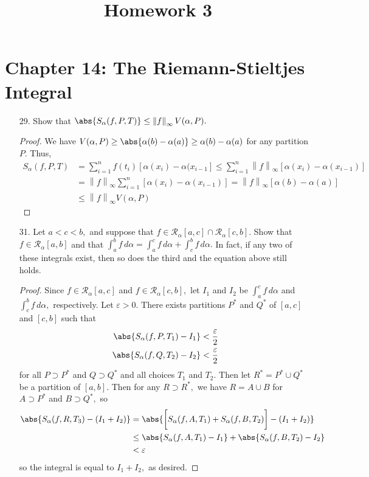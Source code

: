 \documentclass{article}
\begin{document}
\title{Homework 3}
\maketitle
\thispagestyle{fancy}

\section*{Chapter 14: The Riemann-Stieltjes Integral}

\begin{itemize}
	\item[29.] Show that $\abs{S_\alpha(f, P, T)}\le \left\lVert f \right\rVert_\infty V(\alpha, P).$
		\begin{proof}
			We have $V(\alpha, P)\ge \abs{\alpha(b)-\alpha(a)}\ge \alpha(b)-\alpha(a)$ for any partition $P.$ Thus,
			\begin{align*}
				S_\alpha(f, P, T) &= \sum_{i=1}^{n} f(t_i)\left[ \alpha(x_i)-\alpha(x_{i-1} \right] \le \sum_{i=1}^{n} \left\lVert f \right\rVert_\infty \left[ \alpha(x_i)-\alpha(x_{i-1})\right] \\
				&= \left\lVert f \right\rVert_\infty \sum_{i=1}^{n} \left[ \alpha(x_i)-\alpha(x_{i-1}) \right] = \left\lVert f \right\rVert_\infty \left[ \alpha(b)-\alpha(a) \right] \\
				&\le \left\lVert f \right\rVert_\infty V(\alpha, P)
			\end{align*}
		\end{proof}

	\item[31.] Let $a<c<b,$ and suppose that $f\in\mathcal R_\alpha[a, c]\cap \mathcal R_\alpha[c, b].$ Show that $f\in\mathcal R_\alpha[a, b]$ and that $\int_a^bf\, d\alpha=\int_a^c f\, d\alpha + \int_c^b f\, d\alpha.$ In fact, if any two of these integrals exist, then so does the third and the equation above still holds.
		\begin{proof}
			Since $f\in \mathcal R_\alpha[a, c]$ and $f\in\mathcal R_\alpha[c, b],$ let $I_1$ and $I_2$ be $\int_a^c f\, d\alpha$ and $\int_c^b f\, d\alpha,$ respectively. Let $\varepsilon>0.$ There exists partitions $P^*$ and $Q^*$ of $[a, c]$ and $[c, b]$ such that
			\begin{align*}
				\abs{S_\alpha(f, P, T_1)-I_1} &< \frac{\varepsilon}{2} \\
				\abs{S_\alpha(f, Q, T_2) - I_2} &< \frac{\varepsilon}{2}
			\end{align*}
			for all $P\supset P^*$ and $Q\supset Q^*$ and all choices $T_1$ and $T_2.$ Then let $R^*=P^*\cup Q^*$ be a partition of $[a, b].$ Then for any $R\supset R^*,$ we have $R=A\cup B$ for $A\supset P^*$ and $B\supset Q^*,$ so
			\begin{align*}
				\abs{S_\alpha(f, R, T_3)-(I_1+I_2)} &= \abs{\bigg[S_\alpha(f, A, T_1)+S_\alpha(f, B, T_2)\bigg] - (I_1+I_2)} \\
				&\le \abs{S_\alpha(f, A, T_1)-I_1} + \abs{S_\alpha(f, B, T_2) - I_2}\\
				&< \varepsilon
			\end{align*}
			so the integral is equal to $I_1+I_2,$ as desired.
		\end{proof}


\end{itemize}
\end{document}
